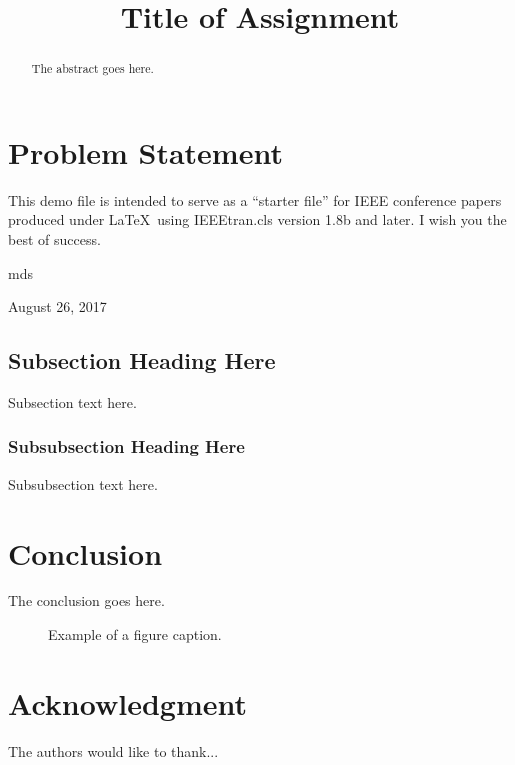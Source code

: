 \documentclass[conference]{neu_handout}
\begin{document}
\title{Title of Assignment}

\author{

}

\maketitle

\begin{abstract}
The abstract goes here.
\end{abstract}

\IEEEpeerreviewmaketitle



\section{Problem Statement}

This demo file is intended to serve as a ``starter file''
for IEEE conference papers produced under \LaTeX\ using
IEEEtran.cls version 1.8b and later.
I wish you the best of success.

\hfill mds
 
\hfill August 26, 2017

\subsection{Subsection Heading Here}
Subsection text here.


\subsubsection{Subsubsection Heading Here}
Subsubsection text here.






\section{Conclusion}
The conclusion goes here.

\begin{figure}[htbp]
\caption{Example of a figure caption.}
\label{fig}
\end{figure}



\section*{Acknowledgment}


The authors would like to thank...




\end{document}
